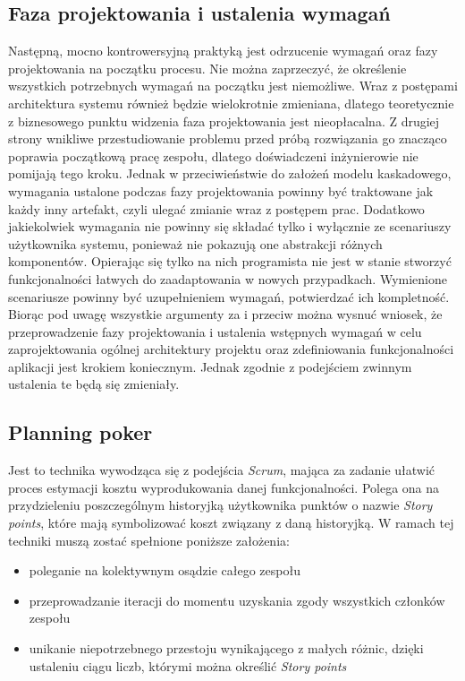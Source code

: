 \subsection{Faza projektowania i ustalenia wymagań}
\label{subsec:fazaProjektowania}

Następną, mocno kontrowersyjną praktyką jest odrzucenie wymagań oraz fazy
projektowania na początku procesu. Nie można zaprzeczyć, że określenie wszystkich
potrzebnych wymagań na początku jest niemożliwe. Wraz z postępami architektura systemu
również będzie wielokrotnie zmieniana, dlatego teoretycznie z biznesowego punktu widzenia
faza projektowania jest nieopłacalna. Z drugiej strony wnikliwe przestudiowanie problemu
przed próbą rozwiązania go znacząco poprawia początkową pracę zespołu, dlatego
doświadczeni inżynierowie nie pomijają tego kroku. Jednak w przeciwieństwie do założeń
modelu kaskadowego, wymagania ustalone podczas fazy projektowania powinny być
traktowane jak każdy inny artefakt, czyli ulegać zmianie wraz z postępem prac.
Dodatkowo jakiekolwiek wymagania nie powinny się składać tylko i wyłącznie ze
scenariuszy użytkownika systemu, ponieważ nie pokazują one abstrakcji różnych
komponentów. Opierając się tylko na nich programista nie jest w stanie stworzyć funkcjonalności
łatwych do zaadaptowania w nowych przypadkach. Wymienione scenariusze powinny być
uzupełnieniem wymagań, potwierdzać ich kompletność. Biorąc pod uwagę wszystkie
argumenty za i przeciw można wysnuć wniosek, że przeprowadzenie fazy projektowania i
ustalenia wstępnych wymagań w celu zaprojektowania ogólnej architektury projektu oraz
zdefiniowania funkcjonalności aplikacji jest krokiem koniecznym. Jednak zgodnie z
podejściem zwinnym ustalenia te będą się zmieniały.

\subsection{Planning poker}
\label{subsec:planningPoker}
Jest to technika wywodząca się z podejścia \textit{Scrum}, mająca za zadanie ułatwić proces estymacji kosztu wyprodukowania danej funkcjonalności. Polega ona na przydzieleniu poszczególnym historyjką użytkownika punktów o nazwie \textit{Story points}, które mają symbolizować koszt związany z daną historyjką. W ramach tej techniki muszą zostać spełnione poniższe założenia\cite{AGI01}:
\begin{itemize}
\item poleganie na kolektywnym osądzie całego zespołu
\item przeprowadzanie iteracji do momentu uzyskania zgody wszystkich członków zespołu
\item unikanie niepotrzebnego przestoju wynikającego z małych różnic, dzięki ustaleniu ciągu liczb, którymi można określić \textit{Story points}
\end{itemize}

